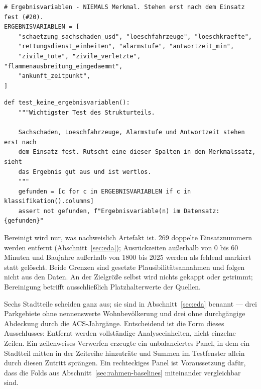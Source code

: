 \begin{lstlisting}[style=pythonstil,
  label={lst:gesperrt},
  caption={Gesperrte Ergebnisvariablen
           (\texttt{prep/config.py}, Z.~168--174)}]
# Ergebnisvariablen - NIEMALS Merkmal. Stehen erst nach dem Einsatz fest (#20).
ERGEBNISVARIABLEN = [
    "schaetzung_sachschaden_usd", "loeschfahrzeuge", "loeschkraefte",
    "rettungsdienst_einheiten", "alarmstufe", "antwortzeit_min",
    "zivile_tote", "zivile_verletzte", "flammenausbreitung_eingedaemmt",
    "ankunft_zeitpunkt",
]
\end{lstlisting}

\begin{lstlisting}[style=pythonstil,
  label={lst:test-leakage},
  caption={Prüfung auf Ergebnisvariablen in der erzeugten Datei
           (\texttt{tests/test\_aufbereitung.py}, Z.~277--285)}]
def test_keine_ergebnisvariablen():
    """Wichtigster Test des Strukturteils.

    Sachschaden, Loeschfahrzeuge, Alarmstufe und Antwortzeit stehen erst nach
    dem Einsatz fest. Rutscht eine dieser Spalten in den Merkmalssatz, sieht
    das Ergebnis gut aus und ist wertlos.
    """
    gefunden = [c for c in ERGEBNISVARIABLEN if c in klassifikation().columns]
    assert not gefunden, f"Ergebnisvariable(n) im Datensatz: {gefunden}"
\end{lstlisting}

Bereinigt wird nur, was nachweislich Artefakt ist. 269 doppelte Einsatznummern
werden entfernt (Abschnitt~\ref{sec:eda}); Ausrückzeiten außerhalb von 0 bis 60
Minuten und Baujahre außerhalb von 1800 bis 2025 werden als fehlend markiert
statt gelöscht. Beide Grenzen sind gesetzte Plausibilitätsannahmen und folgen
nicht aus den Daten. An der Zielgröße selbst wird nichts gekappt oder getrimmt;
Bereinigung betrifft ausschließlich Platzhalterwerte der Quellen.

Sechs Stadtteile scheiden ganz aus; sie sind in Abschnitt~\ref{sec:eda}
benannt --- drei Parkgebiete ohne nennenswerte Wohnbevölkerung und drei ohne
durchgängige Abdeckung durch die ACS-Jahrgänge. Entscheidend ist die Form
dieses Ausschlusses: Entfernt werden vollständige Analyseeinheiten, nicht
einzelne Zeilen. Ein zeilenweises Verwerfen erzeugte ein unbalanciertes Panel,
in dem ein Stadtteil mitten in der Zeitreihe hinzuträte und Summen im
Testfenster allein durch diesen Zutritt sprängen. Ein rechteckiges Panel ist
Voraussetzung dafür, dass die Folds aus Abschnitt~\ref{sec:rahmen-baselines}
miteinander vergleichbar sind.

